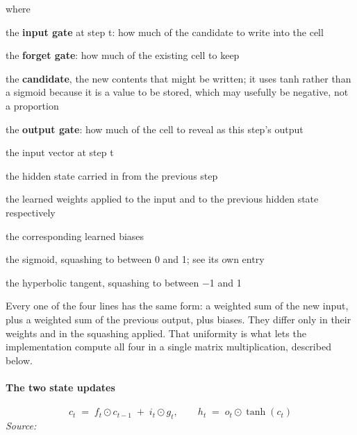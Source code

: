 \noindent where
\begin{description}[leftmargin=2.4em,style=nextline,font=\normalfont\ttfamily]\setlength\itemsep{1pt}
  \item[{$i_t$}] \normalfont the \textbf{input gate} at step t: how much of the candidate to write into the cell
  \item[{$f_t$}] \normalfont the \textbf{forget gate}: how much of the existing cell to keep
  \item[{$g_t$}] \normalfont the \textbf{candidate}, the new contents that might be written; it uses tanh rather than a sigmoid because it is a value to be stored, which may usefully be negative, not a proportion
  \item[{$o_t$}] \normalfont the \textbf{output gate}: how much of the cell to reveal as this step's output
  \item[{$x_t$}] \normalfont the input vector at step t
  \item[{$h_{t-1}$}] \normalfont the hidden state carried in from the previous step
  \item[{$W_{i\ast},\, W_{h\ast}$}] \normalfont the learned weights applied to the input and to the previous hidden state respectively
  \item[{$b_{i\ast},\, b_{h\ast}$}] \normalfont the corresponding learned biases
  \item[{$\sigma$}] \normalfont the sigmoid, squashing to between 0 and 1; see its own entry
  \item[{$\tanh$}] \normalfont the hyperbolic tangent, squashing to between $-$1 and 1
\end{description}
Every one of the four lines has the same form: a weighted sum of the new input, plus a weighted sum of the previous output, plus biases. They differ only in their weights and in the squashing applied. That uniformity is what lets the implementation compute all four in a single matrix multiplication, described below.


\paragraph{The two state updates}

\begin{equation}
c_t \;=\; f_t \odot c_{t-1} \;+\; i_t \odot g_t, \qquad h_t \;=\; o_t \odot \tanh(c_t)
\end{equation}
\noindent\emph{Source: }\cite{hochreiter1997}



